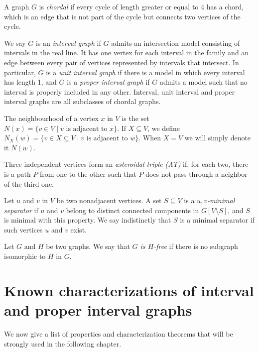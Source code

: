 \documentclass[12pt]{book}
\theoremstyle{plain}
\theoremstyle{remark}
\begin{document}
A graph $G$ is \emph{chordal} if every cycle of length greater or equal to $4$ has a chord, which is an edge that is not part of the cycle but connects two vertices of the cycle.

\vspace{0.5mm}
We say $G$ is an \emph{interval graph } if $G$ admits an intersection model consisting of intervals in the real line. It has one vertex for
each interval in the family and an edge between every pair of vertices represented by intervals that intersect.
In particular, $G$  is a \emph{unit interval graph } if there is a model in which every interval has length 1, and $G$ is a \emph{proper interval graph} if $G$ admits a model such that no interval is properly included in any other.
Interval, unit interval and proper interval graphs are all subclasses of chordal graphs.

The neighbourhood of a vertex  $x$ in $V$ is the set $N(x) = \{ v \in V \mid v \mbox{ is adjacent to } x \}$. 
If $X \subseteq V$, we define $N_{X} (w) = \{ v \in X \subseteq V \mid v \mbox{ is adjacent to } w \}$. When $X=V$ we will simply denote it $N(w)$.

\vspace{0.5mm}
Three independent vertices form an \emph{asteroidal triple (AT) } if, for each two, there is a path $P$ from one to the other such that $P$ does not pass through a neighbor of the third one.

\vspace{0.5mm}
Let $u$ and $v$ in $V$ be two nonadjacent vertices. A set $S \subseteq V$ is a \emph{$u,v$-minimal separator} if $u$ and $v$ belong to distinct connected components in $G \left[ V \setminus S \right]$, and $S$ is minimal with this property. 
We say indistinctly that $S$ is a minimal separator if such vertices $u$ and $v$ exist.

\vspace{0.5mm}
Let $G$ and $H$ be two graphs. We say that \emph{$G$ is $H$-free} if there is no subgraph isomorphic to $H$ in $G$.




\section{Known characterizations of interval and proper interval graphs}

We now give a list of properties and characterization theorems that will be strongly used in the following chapter.
\end{document}
